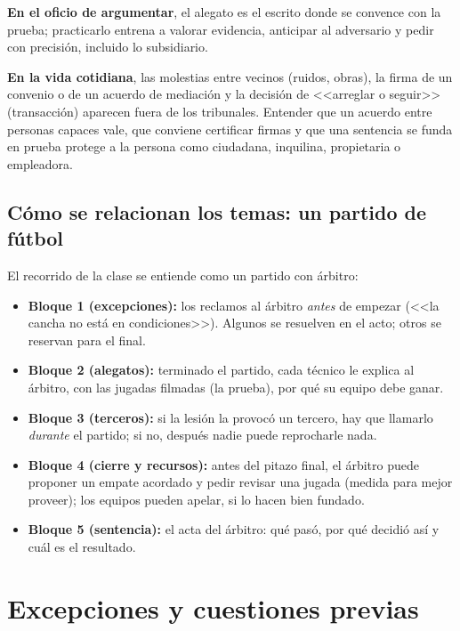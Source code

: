 \documentclass[12pt,oneside]{book}
\begin{document}
\textbf{En el oficio de argumentar}, el alegato es el escrito donde se convence con la prueba; practicarlo entrena a valorar evidencia, anticipar al adversario y pedir con precisi\'on, incluido lo subsidiario.

\textbf{En la vida cotidiana}, las molestias entre vecinos (ruidos, obras), la firma de un convenio o de un acuerdo de mediaci\'on y la decisi\'on de <<arreglar o seguir>> (transacci\'on) aparecen fuera de los tribunales. Entender que un acuerdo entre personas capaces vale, que conviene certificar firmas y que una sentencia se funda en prueba protege a la persona como ciudadana, inquilina, propietaria o empleadora.

\section{C\'omo se relacionan los temas: un partido de f\'utbol}

El recorrido de la clase se entiende como un partido con \'arbitro:

\begin{itemize}
    \item \textbf{Bloque 1 (excepciones):} los reclamos al \'arbitro \emph{antes} de empezar (<<la cancha no est\'a en condiciones>>). Algunos se resuelven en el acto; otros se reservan para el final.
    \item \textbf{Bloque 2 (alegatos):} terminado el partido, cada t\'ecnico le explica al \'arbitro, con las jugadas filmadas (la prueba), por qu\'e su equipo debe ganar.
    \item \textbf{Bloque 3 (terceros):} si la lesi\'on la provoc\'o un tercero, hay que llamarlo \emph{durante} el partido; si no, despu\'es nadie puede reprocharle nada.
    \item \textbf{Bloque 4 (cierre y recursos):} antes del pitazo final, el \'arbitro puede proponer un empate acordado y pedir revisar una jugada (medida para mejor proveer); los equipos pueden apelar, si lo hacen bien fundado.
    \item \textbf{Bloque 5 (sentencia):} el acta del \'arbitro: qu\'e pas\'o, por qu\'e decidi\'o as\'i y cu\'al es el resultado.
\end{itemize}

\chapter[Excepciones y cuestiones previas]{Excepciones y cuestiones previas}
\end{document}
